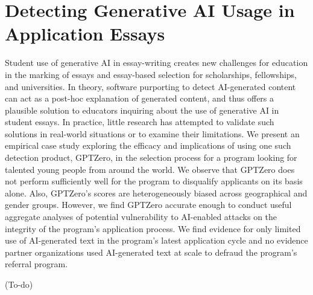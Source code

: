 \section{Detecting Generative AI Usage in Application Essays} %
Student use of generative AI in essay-writing creates new challenges for education in the marking of essays and essay-based selection for scholarships, fellowships, and universities. In theory, software purporting to detect AI-generated content can act as a post-hoc explanation of generated content, and thus offers a plausible solution to educators inquiring about the use of generative AI in student essays. In practice, little research has attempted to validate such solutions in real-world situations or to examine their limitations. We present an empirical case study exploring the efficacy and implications of using one such detection product, GPTZero, in the selection process for a program looking for talented young people from around the world. We observe that GPTZero does not perform sufficiently well for the program to disqualify applicants on its basis alone. Also, GPTZero's scores are heterogeneously biased across geographical and gender groups. However, we find GPTZero accurate enough to conduct useful aggregate analyses of potential vulnerability to AI-enabled attacks on the integrity of the program's application process. We find evidence for only limited use of AI-generated text in the program's latest application cycle and no evidence partner organizations used AI-generated text at scale to defraud the program's referral program.

(To-do)

